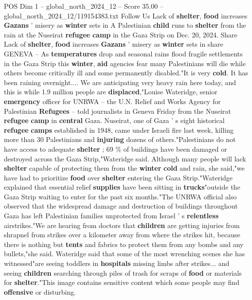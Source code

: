 \begin{textsample}{POS Dim 1 – global\_north\_2024\_12 – Score 35.00 – global\_north\_2024\_12/119154383.txt}  \label{ex:f1_pos_226}
Follow Us Lack of \textbf{shelter}, \textbf{food} increases \textbf{Gazans} ' misery as \textbf{winter} sets in A Palestinian \textbf{child} runs to \textbf{shelter} from the rain at the Nuseirat \textbf{refugee} \textbf{camp} in the Gaza Strip on Dec. 20, 2024.
Share Lack of \textbf{shelter}, \textbf{food} increases \textbf{Gazans} ' misery as \textbf{winter} sets in share GENEVA -- As \textbf{temperatures} drop and seasonal rains flood fragile settlements in the Gaza Strip this \textbf{winter}, \textbf{aid} agencies fear many Palestinians will die while others become critically ill and some permanently disabled."It is very \textbf{cold}.
It has been raining overnight....
We are anticipating very heavy rain here today, and this is while 1.9 million people are \textbf{displaced},"Louise Wateridge, senior \textbf{emergency} officer for UNRWA -- the U.N.
Relief and Works Agency for Palestinian \textbf{Refugees} -- told journalists in Geneva Friday from the Nuseirat \textbf{refugee} \textbf{camp} in \textbf{central} Gaza.
Nuseirat, one of Gaza ' s eight historical \textbf{refugee} \textbf{camps} established in 1948, came under Israeli fire last week, killing more than 30 Palestinians and \textbf{injuring} dozens of others."Palestinians do not have access to adequate \textbf{shelter} ; 69 \% of buildings have been damaged or destroyed across the Gaza Strip,"Wateridge said.
Although many people will lack \textbf{shelter} capable of protecting them from the \textbf{winter} \textbf{cold} and rain, she said,"we have had to prioritize \textbf{food} over \textbf{shelter} entering the Gaza Strip."Wateridge explained that essential relief \textbf{supplies} have been sitting in \textbf{trucks}"outside the Gaza Strip waiting to enter for the past six months."The UNRWA official also observed that the widespread damage and destruction of buildings throughout Gaza has left Palestinian families unprotected from Israel ' s \textbf{relentless} airstrikes."We are hearing from doctors that \textbf{children} are getting injuries from shrapnel from strikes over a kilometer away from where the strikes hit, because there is nothing but \textbf{tents} and fabrics to protect them from any bombs and any bullets,"she said.
Wateridge said that some of the most wrenching scenes she has witnessed"are seeing toddlers in \textbf{hospitals} missing limbs after strikes... and seeing \textbf{children} searching through piles of trash for scraps of \textbf{food} or materials for \textbf{shelter}."This image contains sensitive content which some people may find \textbf{offensive} or disturbing.

\end{textsample}
